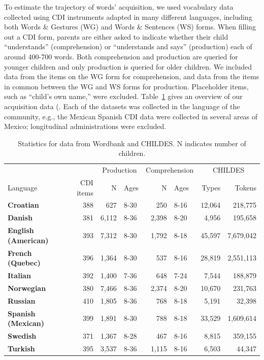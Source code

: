 \documentclass[
   11pt,
       ]{book}
\begin{document}
To estimate the trajectory of words' acquisition, we used vocabulary data collected using CDI instruments adapted in many different languages, including both Words \& Gestures (WG) and Words \& Sentences (WS) forms. When filling out a CDI form, parents are either asked to indicate whether their child ``understands'' (comprehension) or ``understands and says'' (production) each of around 400-700 words. Both comprehension and production are queried for younger children and only production is queried for older children. We included data from the items on the WG form for comprehension, and data from the items in common between the WG and WS forms for production. Placeholder items, such as ``child's own name,'' were excluded. Table~\ref{tab:langstats} gives an overview of our acquisition data (\citealp{kovacevic1996,bleses2008,boudreault2007,trudeau2011,caselli2012,caselli1995,simonsen2014,vershinina2011,eliseeva2009,fenson2003,eriksson2002,acarlar2008}.
Each of the datasets was collected in the language of the community, e.g., the Mexican Spanish CDI data were collected in several areas of Mexico; longitudinal administrations were excluded.

\begin{table}

\caption{\label{tab:langstats}Statistics for data from Wordbank and CHILDES. N indicates number of children.}
\centering
\begin{tabular}[t]{>{}lrrlrlrr}
\toprule
\multicolumn{1}{c}{} & \multicolumn{1}{c}{} & \multicolumn{2}{c}{Production} & \multicolumn{2}{c}{Comprehension} & \multicolumn{2}{c}{CHILDES} \\
\cmidrule(l{3pt}r{3pt}){3-4} \cmidrule(l{3pt}r{3pt}){5-6} \cmidrule(l{3pt}r{3pt}){7-8}
Language & CDI items & N & Ages & N & Ages & Types & Tokens\\
\midrule
\textbf{Croatian} & 388 & 627 & 8-30 & 250 & 8-16 & 12,064 & 218,775\\
\textbf{Danish} & 381 & 6,112 & 8-36 & 2,398 & 8-20 & 4,956 & 195,658\\
\textbf{English (American)} & 393 & 7,312 & 8-30 & 1,792 & 8-18 & 45,597 & 7,679,042\\
\textbf{French (Quebec)} & 396 & 1,364 & 8-30 & 537 & 8-16 & 28,819 & 2,551,113\\
\textbf{Italian} & 392 & 1,400 & 7-36 & 648 & 7-24 & 7,544 & 188,879\\
\textbf{Norwegian} & 380 & 7,466 & 8-36 & 2,374 & 8-20 & 10,670 & 231,763\\
\textbf{Russian} & 410 & 1,805 & 8-36 & 768 & 8-18 & 5,191 & 32,398\\
\textbf{Spanish (Mexican)} & 399 & 1,891 & 8-30 & 788 & 8-18 & 33,529 & 1,609,614\\
\textbf{Swedish} & 371 & 1,367 & 8-28 & 467 & 8-16 & 8,815 & 359,155\\
\textbf{Turkish} & 395 & 3,537 & 8-36 & 1,115 & 8-16 & 6,503 & 44,347\\
\bottomrule
\end{tabular}
\end{table}
\end{document}
